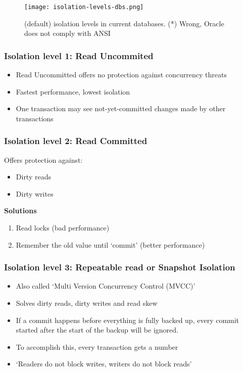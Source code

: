 \documentclass{article}
\begin{document}
\begin{figure}[H]
    \centering
    \texttt{[image: isolation-levels-dbs.png]}
    \caption{(default) isolation levels in current databases. (*) Wrong, Oracle does not comply with ANSI}
\end{figure}


\subsubsection{Isolation level 1: Read Uncommited}

\begin{itemize}
    \item Read Uncommitted offers no protection against concurrency threats
    \item Fastest performance, lowest isolation
    \item One transaction may see not-yet-committed changes made by other transactions
\end{itemize}


\subsubsection{Isolation level 2: Read Committed}

Offers protection against:

\begin{itemize}
    \item Dirty reads
    \item Dirty writes
\end{itemize}

\textbf{Solutions}

\begin{enumerate}
    \item Read locks (bad performance)
    \item Remember the old value until `commit' (better performance)
\end{enumerate}

\subsubsection{Isolation level 3: Repeatable read or Snapshot Isolation}

\begin{itemize}
    \item Also called `Multi Version Concurrency Control (MVCC)'
    \item Solves dirty reads, dirty writes and read skew
    \item If a commit happens before everything is fully backed up, every commit started after the start of the backup will be ignored.
    \item To accomplish this, every transaction gets a number
    \item `Readers do not block writes, writers do not block reads'
\end{itemize}
\end{document}
